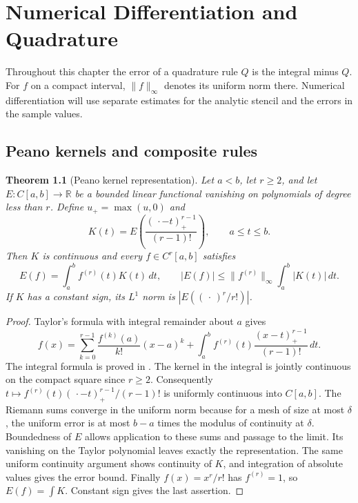 \documentclass[11pt,oneside,openany]{book}
\theoremstyle{plain}
\newtheorem{theorem}{Theorem}[chapter]
\theoremstyle{definition}
\theoremstyle{remark}
\begin{document}
\chapter{Numerical Differentiation and Quadrature}
\label{p206:ch07}

Throughout this chapter the error of a quadrature rule \(Q\) is
the integral minus \(Q\). For \(f\) on a compact interval,
\(\lVert f\rVert_\infty\) denotes its uniform norm there. Numerical
differentiation will use separate estimates for the analytic
stencil and the errors in the sample values.

\section{Peano kernels and composite rules}

\begin{theorem}[Peano kernel representation]\label{p206:W55}
Let \(a<b\), let \(r\ge2\), and let \(E:C[a,b]\to\mathbb R\)
be a bounded linear functional vanishing on polynomials of
degree less than \(r\). Define \(u_+=\max(u,0)\) and
\[
 K(t)=E\!\left(\frac{(\,\cdot-t)_+^{r-1}}{(r-1)!}\right),
 \qquad a\le t\le b.
\]
Then \(K\) is continuous and every \(f\in C^r[a,b]\) satisfies
\[
 E(f)=\int_a^b f^{(r)}(t)K(t)\,dt,\qquad
 |E(f)|\le\lVert f^{(r)}\rVert_\infty\int_a^b|K(t)|\,dt.
\]
If \(K\) has a constant sign, its \(L^1\) norm is
\(\left|E((\,\cdot\,)^r/r!)\right|\).
\end{theorem}

\begin{proof}
Taylor's formula with integral remainder about \(a\) gives
\[
 f(x)=\sum_{k=0}^{r-1}\frac{f^{(k)}(a)}{k!}(x-a)^k
       +\int_a^b f^{(r)}(t)\frac{(x-t)_+^{r-1}}{(r-1)!}\,dt.
\]
The integral formula is proved in \cite[\texttt{K03.06.integral}]{d03}.
The kernel in the integral is jointly continuous on the compact
square since \(r\ge2\). Consequently \(t\mapsto
f^{(r)}(t)(\,\cdot-t)_+^{r-1}/(r-1)!\) is uniformly continuous
into \(C[a,b]\). The Riemann sums converge in the uniform norm
because for a mesh of size at most \(\delta\), the uniform error is
at most \(b-a\) times the modulus of continuity at \(\delta\).
Boundedness of \(E\) allows application to these sums and
passage to the limit. Its vanishing on the Taylor polynomial
leaves exactly the representation. The same uniform continuity
argument shows continuity of \(K\), and integration of absolute
values gives the error bound. Finally \(f(x)=x^r/r!\) has
\(f^{(r)}=1\), so \(E(f)=\int K\). Constant sign gives the
last assertion.
\end{proof}
\end{document}
